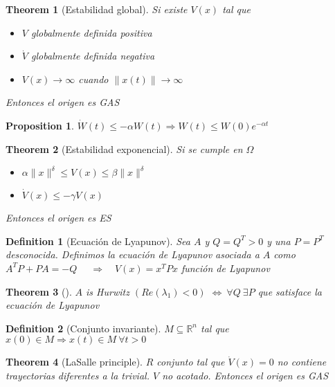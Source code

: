 \documentclass[leqno]{article}
\newtheorem*{theorem}{Theorem}
\newtheorem*{proposition}{Proposition}
\newtheorem*{definition}{Definition}
\begin{document}
\begin{theorem}[Estabilidad global] Si existe $V(x)$ tal que  
  \begin{itemize}[topsep=-6pt, itemsep=0pt]
    \item $V$ globalmente definida positiva
	\item  $\dot{V}$ globalmente definida negativa
	\item $V(x) \to \infty$ cuando $\|x(t)\|\to \infty$
  \end{itemize}
  Entonces el origen es GAS
\end{theorem}

\begin{proposition}
 $\dot{W}(t)\le -\alpha W(t) \Rightarrow W(t)\le W(0)e^{-\alpha t}$ 
\end{proposition}

\begin{theorem}[Estabilidad exponencial]Si se cumple en $\Omega $
  \begin{itemize}[topsep=-6pt, itemsep=0pt]
    \item $\alpha \|x\|^\delta\le V(x)\le \beta \|x\|^\delta$ 
	\item $\dot{V}(x)\le -\gamma V(x)$
  \end{itemize}
  Entonces el origen es ES
\end{theorem}

\begin{definition}[Ecuación de Lyapunov] Sea $A$ y  $Q = Q^T>0$ y una  $P=P^T$ desconocida. Definimos la ecuación de Lyapunov asociada a  $A$ como $A^TP+PA = -Q$
$\quad \Rightarrow  \quad V(x)= x^TPx$ función de Lyapunov
\end{definition}

\begin{theorem}[] $A$ is Hurwitz $(Re(\lambda_1)<0)$ $\iff \ \forall Q \ \exists P$ que satisface la ecuación de Lyapunov
\end{theorem}

\begin{definition}[Conjunto invariante] $M\subseteq \mathbb{R}^n$ tal que $x(0)\in M \Rightarrow x(t)\in M \ \forall t>0$

\end{definition}

\begin{theorem}[LaSalle principle]  $R$ conjunto tal que  $\dot{V}(x)=0$ no contiene trayectorias diferentes a la trivial. $V$ no acotado. Entonces  el origen es  GAS

\end{theorem}
\end{document}
